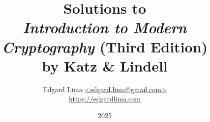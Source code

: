 \documentclass[a4paper,12pt]{book}
\begin{document}
\author{Edgard Lima \href{mailto:edgard.lima@gmail.com}{\textless edgard.lima@gmail.com\textgreater} \\
\href{https://edgardlima.com}{https://edgardlima.com}}
\title{Solutions to \\  \textit{Introduction to Modern Cryptography} (Third Edition) \\ by Katz \& Lindell}

\date{2025}

\frontmatter
\maketitle
\tableofcontents

\mainmatter



\backmatter
\end{document}
